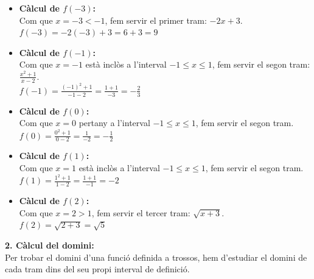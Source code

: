 \documentclass[12pt,a4paper]{article}
\begin{document}
\begin{itemize}
    \item \textbf{Càlcul de $f(-3)$:} \\
    Com que $x = -3 < -1$, fem servir el primer tram: $-2x+3$. \\
    $f(-3) = -2(-3) + 3 = 6 + 3 = 9$
    
    \item \textbf{Càlcul de $f(-1)$:} \\
    Com que $x = -1$ està inclòs a l'interval $-1 \le x \le 1$, fem servir el segon tram: $\frac{x^2+1}{x-2}$. \\
    $f(-1) = \frac{(-1)^2+1}{-1-2} = \frac{1+1}{-3} = -\frac{2}{3}$
    
    \item \textbf{Càlcul de $f(0)$:} \\
    Com que $x = 0$ pertany a l'interval $-1 \le x \le 1$, fem servir el segon tram. \\
    $f(0) = \frac{0^2+1}{0-2} = \frac{1}{-2} = -\frac{1}{2}$
    
    \item \textbf{Càlcul de $f(1)$:} \\
    Com que $x = 1$ està inclòs a l'interval $-1 \le x \le 1$, fem servir el segon tram. \\
    $f(1) = \frac{1^2+1}{1-2} = \frac{1+1}{-1} = -2$
    
    \item \textbf{Càlcul de $f(2)$:} \\
    Com que $x = 2 > 1$, fem servir el tercer tram: $\sqrt{x+3}$. \\
    $f(2) = \sqrt{2+3} = \sqrt{5}$
\end{itemize}

\textbf{2. Càlcul del domini:} \\
Per trobar el domini d'una funció definida a trossos, hem d'estudiar el domini de cada tram dins del seu propi interval de definició.
\end{document}
